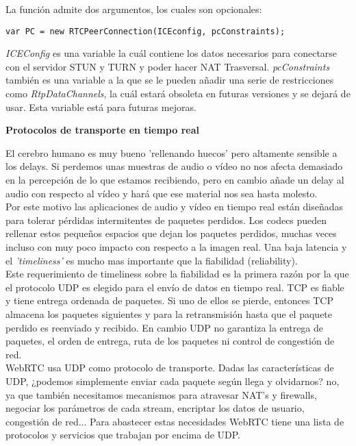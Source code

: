 \noindent La función admite dos argumentos, los cuales son opcionales: 

\begin{lstlisting}[caption=Llamada a función RTCPeerConnection]
var PC = new RTCPeerConnection(ICEconfig, pcConstraints);
\end{lstlisting}

\textit{ICEConfig} es una variable la cuál contiene los datos necesarios para conectarse con el servidor STUN y TURN y poder hacer NAT Trasversal. \textit{pcConstraints} también es una variable a la que se le pueden añadir una serie de restricciones como \textit{RtpDataChannels}, la cuál estará obsoleta en futuras versiones y se dejará de usar. Esta variable está para futuras mejoras.\\

\begin{normalsize}
\noindent \textbf{Protocolos de transporte en tiempo real}\\
\end{normalsize}

El cerebro humano es muy bueno 'rellenando huecos' pero altamente sensible a los delays. Si perdemos unas muestras de audio o vídeo no nos afecta demasiado en la percepción de lo que estamos recibiendo, pero en cambio añade un delay al audio con respecto al vídeo y hará que ese material nos sea hasta molesto.\\

Por este motivo las aplicaciones de audio y vídeo en tiempo real están diseñadas para tolerar pérdidas intermitentes de paquetes perdidos. Los codecs pueden rellenar estos pequeños espacios que dejan los paquetes perdidos, muchas veces incluso con muy poco impacto con respecto a la imagen real. Una baja latencia y el \textit{'timeliness'} es mucho mas importante que la fiabilidad (reliability).\\

Este requerimiento de timeliness sobre la fiabilidad es la primera razón por la que el protocolo UDP es elegido para el envío de datos en tiempo real. TCP es fiable y tiene entrega ordenada de paquetes. Si uno de ellos se pierde, entonces TCP almacena los paquetes siguientes y para la retransmisión hasta que el paquete perdido es reenviado y recibido. En cambio UDP no garantiza la entrega de paquetes, el orden de entrega, ruta de los paquetes ni control de congestión de red.\\

WebRTC usa UDP como protocolo de transporte. Dadas las características de UDP, ¿podemos simplemente enviar cada paquete según llega y olvidarnos? no, ya que también necesitamos mecanismos para atravesar NAT's y firewalls, negociar los parámetros de cada stream, encriptar los datos de usuario, congestión de red... Para abastecer estas necesidades WebRTC tiene una lista de protocolos y servicios que trabajan por encima de UDP.\\

